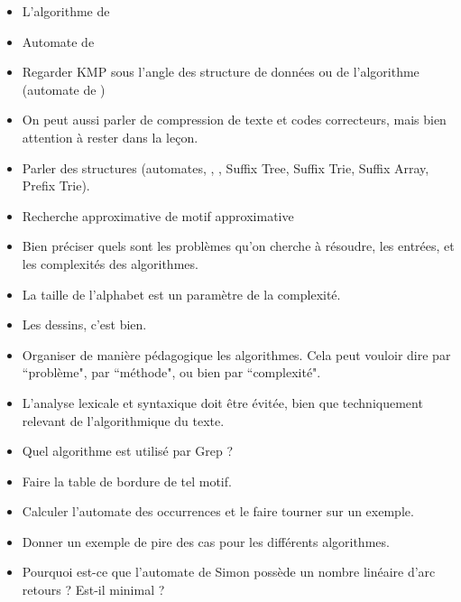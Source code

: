 \documentclass{agregfiche}
\begin{document}
\begin{itemize}
	\item L'algorithme de 
	\item Automate de 
	\item Regarder KMP sous l'angle des structure de données 
	ou de l'algorithme (automate de )
	\item 
	On peut aussi parler de compression de texte et codes 
	correcteurs, mais bien attention à rester dans la leçon.
	\item 
	Parler des structures (automates, , ,
	Suffix Tree, Suffix Trie, Suffix Array, Prefix Trie).
	
	\item Recherche approximative de motif approximative
\end{itemize}

\secpieges

\begin{itemize}
    \item Bien préciser quels sont les problèmes qu'on cherche 
        à résoudre, les entrées, et les complexités des algorithmes.

    \item La taille de l'alphabet est un paramètre de la complexité.

    \item Les dessins, c'est bien.

    \item Organiser de manière pédagogique les algorithmes.
        Cela peut vouloir dire par ``problème", par ``méthode", ou 
        bien par ``complexité".

    \item L'analyse lexicale et syntaxique doit être évitée, bien que techniquement
        relevant de l'algorithmique du texte.

\end{itemize}

\secquestionsclassiques

\begin{itemize}
    \item Quel algorithme est utilisé par Grep ?
    \item Faire la table de bordure de tel motif.
    \item Calculer l'automate des occurrences et le faire tourner sur un exemple.
    \item Donner un exemple de pire des cas pour les différents algorithmes.
    \item Pourquoi est-ce que l'automate de Simon possède un nombre linéaire
        d'arc retours ? Est-il minimal ?
\end{itemize}
\end{document}
